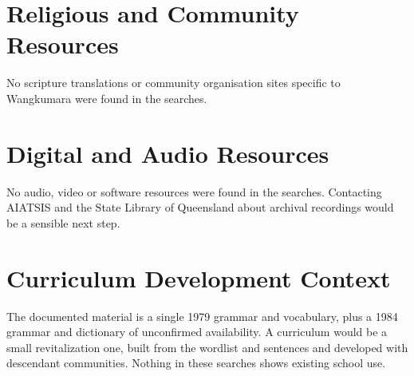 \documentclass[12pt]{article}
\begin{document}
\section{Religious and Community Resources}
No scripture translations or community organisation sites specific to Wangkumara were found in the searches.

\section{Digital and Audio Resources}
No audio, video or software resources were found in the searches. Contacting AIATSIS and the State Library of Queensland about archival recordings would be a sensible next step.

\section{Curriculum Development Context}
The documented material is a single 1979 grammar and vocabulary, plus a 1984 grammar and dictionary of unconfirmed availability. A curriculum would be a small revitalization one, built from the wordlist and sentences and developed with descendant communities. Nothing in these searches shows existing school use.
\end{document}
